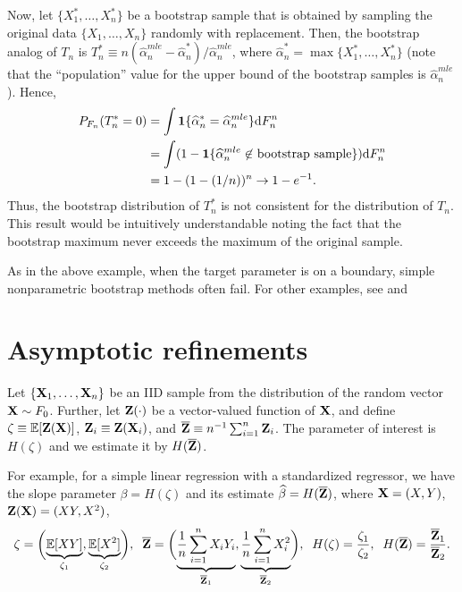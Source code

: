 \documentclass[11pt, A4paper, openany, uplatex]{book}
\begin{document}
Now, let $\{X_1^*, \ldots, X_n^*\}$ be a bootstrap sample that is obtained by sampling the original data $\{X_1, \ldots, X_n\}$ randomly with replacement.
Then, the bootstrap analog of $T_n$ is $T_n^* \equiv n(\hat \alpha_n^{mle} - \hat \alpha_n^*)/\hat \alpha_n^{mle}$, where $\hat \alpha_n^* = \max\{X_1^*, \ldots, X_n^*\}$ (note that the ``population'' value for the upper bound of the bootstrap samples is $\hat \alpha_n^{mle}$).
Hence,
\begin{align*}
	P_{F_n}(T_n^* = 0)
	& = \int \mathbf{1}\{\widehat \alpha_n^* = \widehat \alpha_n^{mle}\} \mathrm{d} F_n^n\\
	& = \int (1 - \mathbf{1}\{\text{$\widehat \alpha_n^{mle} \not\in $ bootstrap sample}\}) \mathrm{d} F_n^n\\
	& = 1 - (1 - (1/n))^n \to 1 - e^{-1}.
\end{align*}
Thus, the bootstrap distribution of $T_n^*$ is not consistent for the distribution of $T_n$.
This result would be intuitively understandable noting the fact that the bootstrap maximum never exceeds the maximum of the original sample.

As in the above example, when the target parameter is on a boundary, simple nonparametric bootstrap methods often fail.
For other examples, see \cite{HOROWITZ20013159} and \cite{horowitz2019bootstrap}

\section{Asymptotic refinements}

Let $\{\mathbf{X}_1, \ldots, \mathbf{X}_n\}$ be an IID sample from the distribution of the random vector $\mathbf{X} \sim F_0$.
Further, let $\mathbf{Z}(\cdot)$ be a vector-valued function of $\mathbf{X}$, and define $\zeta \equiv \mathbb{E} [\mathbf{Z}(\mathbf{X})]$, $\mathbf{Z}_i \equiv \mathbf{Z}(\mathbf{X}_i)$, and $\overline{\mathbf{Z}} \equiv n^{-1} \sum_{i = 1}^n \mathbf{Z}_i$.
The parameter of interest is $H(\zeta)$ and we estimate it by $H(\overline{\mathbf{Z}})$.

For example, for a simple linear regression with a standardized regressor, we have the slope parameter $\beta = H(\zeta)$ and its estimate $\widehat \beta = H(\overline{\mathbf{Z}})$, where $\mathbf{X} = (X, Y)$, $\mathbf{Z}(\mathbf{X}) = (X Y , X^2 )$, 
\begin{align*}
	\zeta = \biggl(\underbrace{\mathbb{E}[XY]}_{\zeta_1}, \underbrace{\mathbb{E}[X^2]}_{\zeta_2}\biggr), 
	\;\; \overline{\mathbf{Z}} = \biggl(\underbrace{\frac{1}{n} \sum_{i = 1}^n X_i Y_i}_{\overline{\mathbf{Z}}_1}, \underbrace{\frac{1}{n} \sum_{i = 1}^n X_i^2}_{\overline{\mathbf{Z}}_2} \biggr),
	\;\;
	H(\zeta) = \frac{\zeta_1}{\zeta_2}, 
	\;\;  H(\overline{\mathbf{Z}}) = \frac{\overline{\mathbf{Z}}_1}{\overline{\mathbf{Z}}_2}.
\end{align*}
\end{document}
